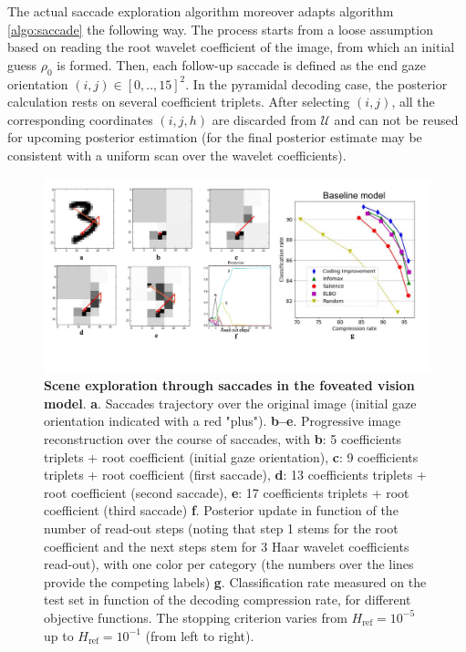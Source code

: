 \documentclass[12pt,twoside,openright]{article}
\begin{document}
The actual saccade exploration algorithm moreover adapts algorithm \ref{algo:saccade} the following way. The process starts from a loose assumption based on reading the root wavelet coefficient of the image, from which an initial guess $\rho_0$ is formed. Then, each follow-up saccade is {\color{Purple} defined as the end gaze orientation} $(i,j) \in [0,..,15]^2$. {\color{Purple}In the pyramidal decoding case}, the posterior calculation rests on several coefficient triplets. After selecting $(i,j)$, all the corresponding coordinates $(i,j,h)$ are discarded from $\mathcal{U}$ and can not be reused for upcoming posterior estimation (for the final posterior estimate may be consistent with a uniform scan over the wavelet coefficients). 

\begin{figure}[b!]
	\centerline{
		\includegraphics[width=\linewidth]{img/NIPS-saccade.pdf}}
	\vspace{-.2cm}
	\caption{\textbf{Scene exploration through saccades in the foveated vision model}. \textbf{a}. Saccades trajectory over the original image (initial gaze orientation indicated with a red "plus"). \textbf{b--e}. Progressive image reconstruction over the course of saccades, with \textbf{b}: 5 coefficients triplets + root coefficient (initial gaze orientation), \textbf{c}: 9 coefficients triplets + root coefficient (first saccade), \textbf{d}: 13 coefficients triplets + root coefficient (second saccade), \textbf{e}: 17 coefficients triplets + root coefficient (third saccade) \textbf{f}. Posterior update in function of the number of read-out steps (noting that step 1 stems for the root coefficient and the next steps stem for 3 Haar wavelet coefficients read-out), with one color per category (the numbers over the lines provide the competing labels) \textbf{g}.  Classification rate measured on the test set in function of the decoding compression rate, for different objective functions. The stopping criterion varies from $H_\text{ref}=10^{-5}$ up to  $H_\text{ref}=10^{-1}$ (from left to right).}\label{fig:foveated-saccades}
\end{figure}
\end{document}
